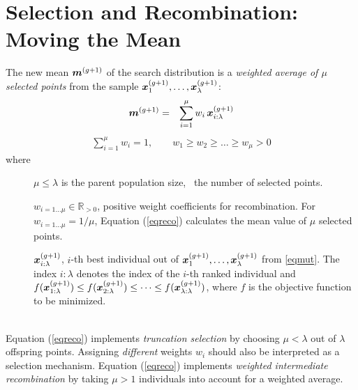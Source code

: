 \documentclass{article} %
\newcommand{\myframe}[1]{ %
\vspace{0.5ex}\par\noindent
      \frame{\parbox{\textwidth}{#1}}\vspace{0.2ex}
  }
\newcommand{\equationframe}[1]{\myframe{#1}}
\newcommand{\R}{\mathbb{R}}
\newcommand{\kom}[1]{}
\newcommand{\where}[1]{%
  \begin{description}
  \item[]#1 \vspace{-0.9ex}
  \end{description}
}
\newcommand{\whereende}{\vspace{2ex}~\\}
\newcommand{\ve}[1]{\mathchoice{\mbox{\boldmath$\displaystyle#1$}}
  {\mbox{\boldmath$\textstyle#1$}} {\mbox{\boldmath$\scriptstyle#1$}}
  {\mbox{\boldmath$\scriptscriptstyle#1$}}}
\newcommand{\summ}[2]{\sum_{#1=1}^{#2}}
\newcommand{\lam}{\ensuremath{\lambda}}
\newcommand{\xgg}{\ve{x}^{(g+1)}}
\renewcommand{\whereende}{\vspace{1ex}~\\}
\newcommand{\xmean}{\ensuremath{\ve{m}}}
\newcommand{\xmeangg}{\ensuremath{\xmean^{(g+1)}}}
\newcommand{\Eqref}[1]{Equation (\ref{#1})}
\begin{document}
\section{Selection and Recombination: Moving the Mean}

The new mean $\xmeangg$ of the search distribution is a \emph{weighted
  average of $\mu$ selected points} from the sample
$\xgg_1,\dots,\xgg_\lam$\kom{ \cite{Hansen:2001}}:
%
\begin{eqnarray}
  \xmeangg &=& \summ{i}{\mu} w_i\, \ve{x}_{i:\lam}^{(g+1)}
     \label{eqreco}
\end{eqnarray}
\begin{eqnarray}\label{eqweights}
  \sum_{i=1}^{\mu} w_i = 1, \qquad  w_1\ge w_2\ge\dots\ge w_\mu>0
\end{eqnarray}
%
where 
%
\where{$\mu\le\lam$ is the parent population size, \ie\ the number of
  selected points. }
%
\where{$w_{i=1\dots\mu}\in\R_{>0}$, positive weight coefficients for
  recombination.  For $w_{i=1\dots\mu}={1}/{\mu}$, \Eqref{eqreco}
  calculates the mean value of $\mu$ selected points. }
%
\where{$\xgg_{i:\lam}$, $i$-th best individual out of
  $\xgg_1,\dots,\xgg_\lam$ from \eqref{eqmut}. The index
  \mbox{$i:\lam$} denotes the index of the $i$-th ranked individual
  and $f(\xgg_{1:\lam})\le f(\xgg_{2:\lam})\le\dots\le
  f(\xgg_{\lam:\lam})$, where $f$ is the objective function to be
  minimized.}
%
\whereende
%
 \Eqref{eqreco} implements \emph{truncation selection} by choosing
 $\mu<\lam$ out of $\lam$ offspring points.  Assigning
 \emph{different} weights $w_i$ should also be interpreted as a
 selection mechanism. \Eqref{eqreco} implements \emph{weighted intermediate
 recombination} by taking $\mu>1$ individuals into account for a
 weighted average.
\end{document}
